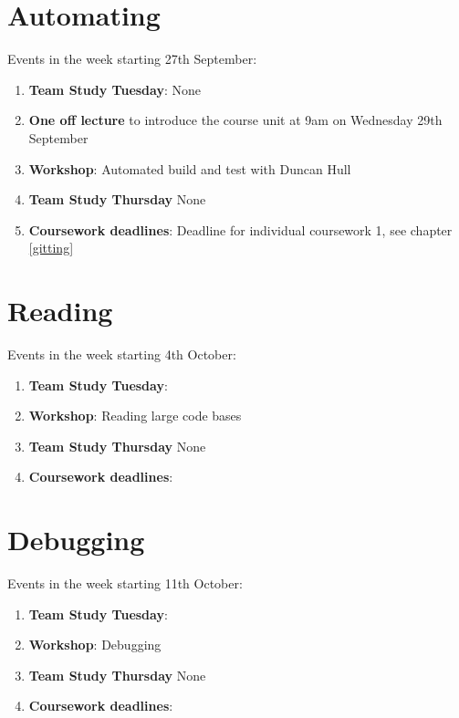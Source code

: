 \documentclass[
]{book}
\providecommand{\tightlist}{%
  \setlength{\itemsep}{0pt}\setlength{\parskip}{0pt}}
\begin{document}
\hypertarget{week1}{%
\section{Automating}\label{week1}}

Events in the week starting 27th September:

\begin{enumerate}
\def\labelenumi{\arabic{enumi}.}
\tightlist
\item
  \textbf{Team Study Tuesday}: None
\item
  \textbf{One off lecture} to introduce the course unit at 9am on Wednesday 29th September
\item
  \textbf{Workshop}: Automated build and test with Duncan Hull
\item
  \textbf{Team Study Thursday} None
\item
  \textbf{Coursework deadlines}: Deadline for individual coursework 1, see chapter \ref{gitting}
\end{enumerate}

\hypertarget{week2}{%
\section{Reading}\label{week2}}

Events in the week starting 4th October:

\begin{enumerate}
\def\labelenumi{\arabic{enumi}.}
\tightlist
\item
  \textbf{Team Study Tuesday}:
\item
  \textbf{Workshop}: Reading large code bases
\item
  \textbf{Team Study Thursday} None
\item
  \textbf{Coursework deadlines}:
\end{enumerate}

\hypertarget{week3}{%
\section{Debugging}\label{week3}}

Events in the week starting 11th October:

\begin{enumerate}
\def\labelenumi{\arabic{enumi}.}
\tightlist
\item
  \textbf{Team Study Tuesday}:
\item
  \textbf{Workshop}: Debugging
\item
  \textbf{Team Study Thursday} None
\item
  \textbf{Coursework deadlines}:
\end{enumerate}
\end{document}
